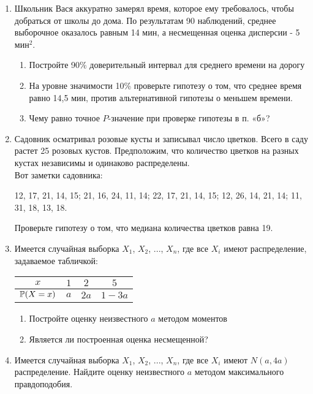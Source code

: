 \begin{enumerate}
\item Школьник Вася аккуратно замерял время, которое ему требовалось, чтобы добраться от школы до дома. По результатам 90 наблюдений, среднее выборочное оказалось равным 14 мин, а несмещенная оценка дисперсии - 5 мин$^{2}$.
\begin{enumerate}
\item Постройте 90\% доверительный интервал для среднего времени на дорогу
\item На уровне значимости 10\% проверьте гипотезу о том, что среднее время равно 14,5 мин, против альтернативной гипотезы о меньшем времени.
\item Чему равно точное $P$-значение при проверке гипотезы в п. «б»?
\end{enumerate}

\item Садовник осматривал розовые кусты и записывал число цветков. Всего в саду растет 25 розовых кустов. Предположим, что количество цветков на разных кустах независимы и одинаково распределены. \\
Вот заметки садовника:

12, 17, 21, 14, 15; 21, 16, 24, 11, 14; 22, 17, 21, 14, 15; 12, 26, 14, 21, 14; 11, 31, 18, 13, 18.

Проверьте гипотезу о том, что медиана количества цветков равна 19.

\item Имеется случайная выборка $X_{1}$, $X_{2}$, ..., $X_{n}$, где все $X_{i}$ имеют распределение, задаваемое табличкой:

\begin{tabular}{@{}cccc@{}}
\toprule
$x$         & $1$ & $2$  & $5$    \\ \midrule
$\P(X=x)$ & $a$ & $2a$ & $1-3a$ \\ \bottomrule
\end{tabular}
\begin{enumerate}
\item Постройте оценку неизвестного $a$ методом моментов
\item Является ли построенная оценка несмещенной?
\end{enumerate}

\item Имеется случайная выборка $X_{1}$, $X_{2}$, ..., $X_{n}$, где все $X_{i}$ имеют $N(a,4a)$ распределение.
Найдите оценку неизвестного $a$ методом максимального правдоподобия.


\end{enumerate}
